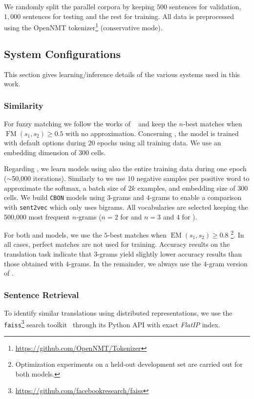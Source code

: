 We randomly split the parallel corpora by keeping $500$ sentences for validation, $1,000$ sentences for testing and the rest for training.
All data is preprocessed using the OpenNMT tokenizer\footnote{\url{https://github.com/OpenNMT/Tokenizer}} (conservative mode). 

\subsection{System Configurations}
\label{ssec:config-chap8}
This section gives learning/inference details of the various systems used in this work.
\subsubsection*{Similarity} 
For fuzzy matching  we follow the works of ~\citet{Koehn10convergence,bulte19neural,xu20boosting} and keep the $n$-best matches when $\operatorname{FM}(s_1,s_2) \geq 0.5$ with no approximation.
%
Concerning , the model is trained with default options during 20 epochs using all training data. We use an embedding dimension of 300 cells. 

Regarding , we learn models using also the entire training data during one epoch ($\sim$50,000 iterations). Similarly to  we use $10$ negative samples per positive word to approximate the softmax, a batch size of $2k$ examples, and embedding size of 300 cells. 
%
We build \texttt{CBON} models using $3$-grams and $4$-grams to enable a comparison with \texttt{sent2vec} which only uses bigrams.
All vocabularies are selected keeping the 500,000 most frequent $n$-grams ($n=2$ for  and $n=3$ and $4$ for ).

For both  and  models, we use the $5$-best matches when $\operatorname{EM}(s_1,s_2) \geq 0.8$ \footnote{Optimization experiments on a held-out development set are carried out for both models.}. 
In all cases, perfect matches are not used for training.
%
Accuracy results on the translation task indicate that $3$-grams yield slightly lower accuracy results than those obtained with $4$-grams. In the remainder, we always use the $4$-gram version of .
\subsubsection*{Sentence Retrieval}
To identify similar translations using distributed representations, we use the \texttt{faiss}\footnote{\url{https://github.com/facebookresearch/faiss}} search toolkit~\citep{Johnson19billion} through its Python API with exact \textit{FlatIP} index. 
